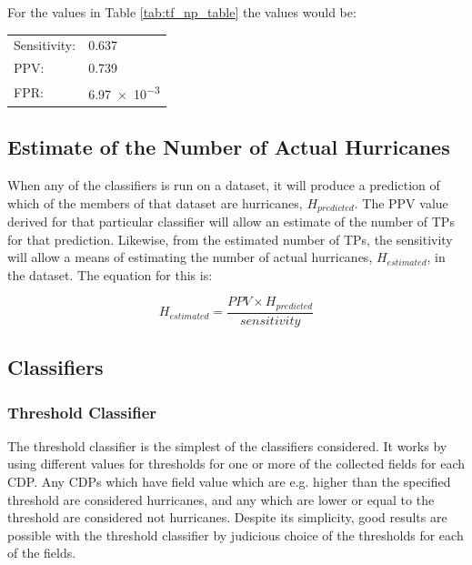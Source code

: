 \documentclass[pdftex,12pt,a4paper]{report}
\begin{document}
For the values in Table \ref{tab:tf_np_table} the values would be:

\begin{table}[hb!]
    \centering
    \begin{tabular}{ l l }
        Sensitivity: & \SI{0.637}{} \\
        PPV: & \SI{0.739}{} \\
        FPR: & \SI{6.97e-3}{} \\
    \end{tabular}
    \label{tab:success_metric_table}
\end{table}

\subsection{Estimate of the Number of Actual Hurricanes}
\label{sec:estimated_hurricanes}

When any of the classifiers is run on a dataset, it will produce a prediction of which of the
members of that dataset are hurricanes, $H_{predicted}$. The PPV value derived for that particular classifier will
allow an estimate of the number of TPs for that prediction. Likewise, from the estimated number of
TPs, the sensitivity will allow a means of estimating the number of actual hurricanes, $H_{estimated}$,
in the dataset. The equation for this is:

\begin{equation}
    H_{estimated} = \frac{PPV \times H_{predicted}}{sensitivity}
    \label{eqn:n_actual_hurricane}
\end{equation}

\subsection{Classifiers}


\subsubsection{Threshold Classifier}
The threshold classifier is the simplest of the classifiers considered. It works by using different
values for thresholds for one or more of the collected fields for each CDP. Any CDPs which have
field value which are e.g. higher than the specified threshold are considered hurricanes, and any
which are lower or equal to the threshold are considered not hurricanes. Despite its simplicity,
good results are possible with the threshold classifier by judicious choice of the thresholds for
each of the fields. 
\end{document}
